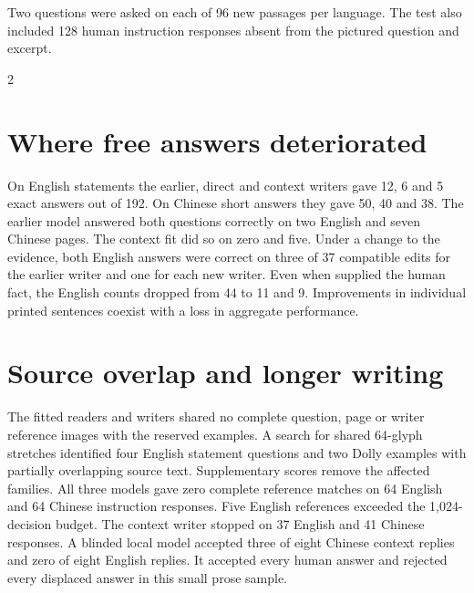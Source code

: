 \newpage
{}
\noindent Two questions were asked on each of 96 new passages per language. The test also included 128 human instruction responses absent from the pictured question and excerpt.
\begin{multicols}{2}
\section*{Where free answers deteriorated}
On English statements the earlier, direct and context writers gave 12, 6 and 5 exact answers out of 192. On Chinese short answers they gave 50, 40 and 38. The earlier model answered both questions correctly on two English and seven Chinese pages. The context fit did so on zero and five. Under a change to the evidence, both English answers were correct on three of 37 compatible edits for the earlier writer and one for each new writer. Even when supplied the human fact, the English counts dropped from 44 to 11 and 9. Improvements in individual printed sentences coexist with a loss in aggregate performance.
\section*{Source overlap and longer writing}
The fitted readers and writers shared no complete question, page or writer reference images with the reserved examples. A search for shared 64-glyph stretches identified four English statement questions and two Dolly examples with partially overlapping source text. Supplementary scores remove the affected families. All three models gave zero complete reference matches on 64 English and 64 Chinese instruction responses. Five English references exceeded the 1,024-decision budget. The context writer stopped on 37 English and 41 Chinese responses. A blinded local model accepted three of eight Chinese context replies and zero of eight English replies. It accepted every human answer and rejected every displaced answer in this small prose sample.

\end{multicols}

